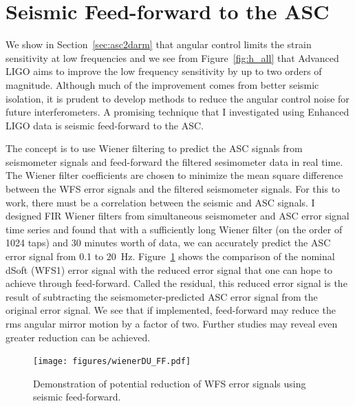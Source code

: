 \section{Seismic Feed-forward to the ASC}
We show in Section~\ref{sec:asc2darm} that angular control limits the
strain sensitivity at low frequencies and we see from
Figure~\ref{fig:h_all} that Advanced LIGO aims to improve the low
frequency sensitivity by up to two orders of magnitude. Although much
of the improvement comes from better seismic isolation, it is prudent
to develop methods to reduce the angular control noise for future
interferometers. A promising technique that I investigated using
Enhanced LIGO data is seismic feed-forward to the ASC.

The concept is to use Wiener filtering \cite{Wiener1975Extrapolation}
to predict the ASC signals from seismometer signals and feed-forward
the filtered sesimometer data in real time. The Wiener filter
coefficients are chosen to minimize the mean square difference between
the WFS error signals and the filtered seismometer signals. For this
to work, there must be a correlation between the seismic and ASC
signals. I designed FIR Wiener filters from simultaneous seismometer
and ASC error signal time series and found that with a sufficiently
long Wiener filter (on the order of 1024 taps) and 30 minutes worth of
data, we can accurately predict the ASC error signal from 0.1 to
20~Hz. Figure~\ref{fig:wienerFF} shows the comparison of the nominal
dSoft (WFS1) error signal with the reduced error signal that one can
hope to achieve through feed-forward. Called the residual, this
reduced error signal is the result of subtracting the
seismometer-predicted ASC error signal from the original error signal.
We see that if implemented, feed-forward may reduce the rms angular
mirror motion by a factor of two. Further studies may reveal even
greater reduction can be achieved.

\begin{figure}
\begin{centering}
\texttt{[image: figures/wienerDU\_FF.pdf]}
\caption[Demonstration of potential reduction of WFS error signals
using seismic feed-forward]{Demonstration of potential reduction of
  WFS error signals using seismic feed-forward.}
\label{fig:wienerFF}
\end{centering}
\end{figure}

